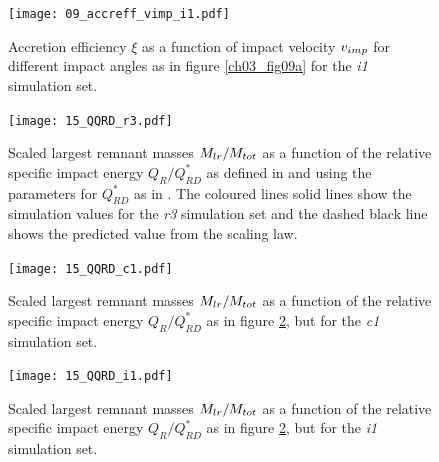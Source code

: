 \begin{landscape}
\begin{figure}[htbp]
\begin{center}
\texttt{[image: 09\_accreff\_vimp\_i1.pdf]}
\caption{Accretion efficiency $\xi$ as a function of impact velocity $v_{imp}$ for different impact angles as in figure \ref{ch03_fig09a} for the \emph{i1} simulation set.}
\label{ch03_fig09c}
\end{center}
\end{figure}

\begin{figure}[htbp]
\begin{center}
\texttt{[image: 15\_QQRD\_r3.pdf]}
\caption{Scaled largest remnant masses $M_{lr} / M_{tot}$ as a function of the relative specific impact energy $Q_R / Q^*_{RD}$ as defined in \cite{Stewart:2009p3265} and using the parameters for $Q^*_{RD}$ as in \cite{2010ApJ...712L..73M}. The coloured lines solid lines show the simulation values for the \emph{r3} simulation set and the dashed black line shows the predicted value from the scaling law.}
\label{ch03_fig15a}
\end{center}
\end{figure}

\begin{figure}[htbp]
\begin{center}
\texttt{[image: 15\_QQRD\_c1.pdf]}
\caption{Scaled largest remnant masses $M_{lr} / M_{tot}$ as a function of the relative specific impact energy $Q_R / Q^*_{RD}$ as in figure \ref{ch03_fig15a}, but for the \emph{c1} simulation set.}
\label{ch03_fig15b}
\end{center}
\end{figure}

\begin{figure}[htbp]
\begin{center}
\texttt{[image: 15\_QQRD\_i1.pdf]}
\caption{Scaled largest remnant masses $M_{lr} / M_{tot}$ as a function of the relative specific impact energy $Q_R / Q^*_{RD}$ as in figure \ref{ch03_fig15a}, but for the \emph{i1} simulation set.}
\label{ch03_fig15c}
\end{center}
\end{figure}
\end{landscape}



